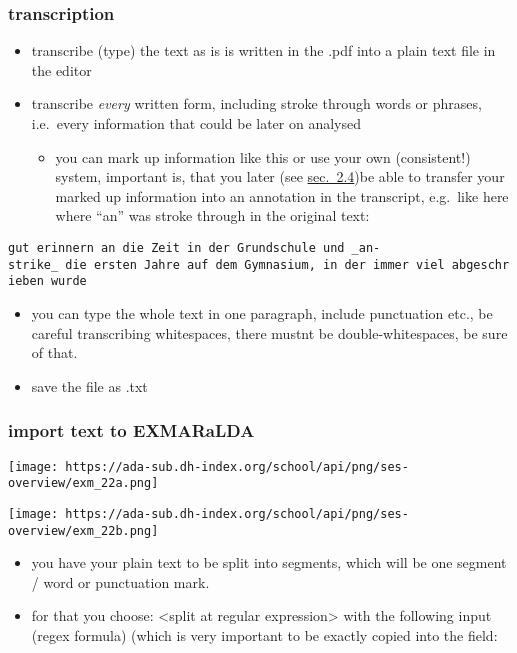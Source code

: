 \documentclass[
  12pt,
]{article}
\providecommand{\tightlist}{%
  \setlength{\itemsep}{0pt}\setlength{\parskip}{0pt}}
\begin{document}
\hypertarget{transcription}{%
\subsubsection{transcription}\label{transcription}}

\begin{itemize}
\tightlist
\item
  transcribe (type) the text as is is written in the .pdf into a plain
  text file in the editor
\item
  transcribe \emph{every} written form, including stroke through words
  or phrases, i.e.~every information that could be later on analysed

  \begin{itemize}
  \tightlist
  \item
    you can mark up information like this or use your own (consistent!)
    system, important is, that you later (see
    \href{be1_exmaralda-041.md}{sec.~2.4})be able to transfer your
    marked up information into an annotation in the transcript,
    e.g.~like here where ``an'' was stroke through in the original text:
  \end{itemize}
\end{itemize}

\texttt{gut\ erinnern\ an\ die\ Zeit\ in\ der\ Grundschule\ und\ \_an-strike\_\ die\ ersten\ Jahre\ auf\ dem\ Gymnasium,\ in\ der\ immer\ viel\ abgeschrieben\ wurde}

\begin{itemize}
\tightlist
\item
  you can type the whole text in one paragraph, include punctuation
  etc., be careful transcribing whitespaces, there mustnt be
  double-whitespaces, be sure of that.
\item
  save the file as .txt
\end{itemize}

\hypertarget{import-text-to-exmaralda}{%
\subsubsection{import text to
EXMARaLDA}\label{import-text-to-exmaralda}}

\texttt{[image: https://ada-sub.dh-index.org/school/api/png/ses-overview/exm\_22a.png]}

\texttt{[image: https://ada-sub.dh-index.org/school/api/png/ses-overview/exm\_22b.png]}

\begin{itemize}
\tightlist
\item
  you have your plain text to be split into segments, which will be one
  segment / word or punctuation mark.
\item
  for that you choose: \textless split at regular
  expression\textgreater{} with the following input (regex formula)
  (which is very important to be exactly copied into the field:
\end{itemize}
\end{document}
